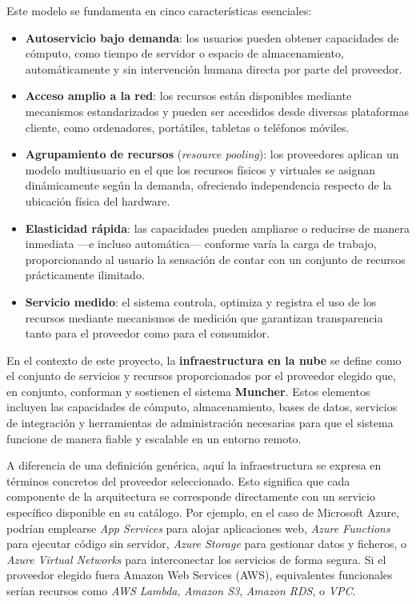 Este modelo se fundamenta en cinco características esenciales:

\begin{itemize}
	\item \textbf{Autoservicio bajo demanda}: los usuarios pueden obtener capacidades de cómputo, como tiempo de servidor o espacio de almacenamiento, automáticamente y sin intervención humana directa por parte del proveedor.

	\item \textbf{Acceso amplio a la red}: los recursos están disponibles mediante mecanismos estandarizados y pueden ser accedidos desde diversas plataformas cliente, como ordenadores, portátiles, tabletas o teléfonos móviles.

	\item \textbf{Agrupamiento de recursos} (\textit{resource pooling}): los proveedores aplican un modelo multiusuario en el que los recursos físicos y virtuales se asignan dinámicamente según la demanda, ofreciendo independencia respecto de la ubicación física del hardware.

	\item \textbf{Elasticidad rápida}: las capacidades pueden ampliarse o reducirse de manera inmediata —e incluso automática— conforme varía la carga de trabajo, proporcionando al usuario la sensación de contar con un conjunto de recursos prácticamente ilimitado.

	\item \textbf{Servicio medido}: el sistema controla, optimiza y registra el uso de los recursos mediante mecanismos de medición que garantizan transparencia tanto para el proveedor como para el consumidor.
\end{itemize}

En el contexto de este proyecto, la \textbf{infraestructura en la nube} se define como el conjunto de servicios y recursos proporcionados por el proveedor elegido que, en conjunto, conforman y sostienen el sistema \textbf{Muncher}. Estos elementos incluyen las capacidades de cómputo, almacenamiento, bases de datos, servicios de integración y herramientas de administración necesarias para que el sistema funcione de manera fiable y escalable en un entorno remoto.

A diferencia de una definición genérica, aquí la infraestructura se expresa en términos concretos del proveedor seleccionado. Esto significa que cada componente de la arquitectura se corresponde directamente con un servicio específico disponible en su catálogo. Por ejemplo, en el caso de Microsoft Azure, podrían emplearse \textit{App Services} para alojar aplicaciones web, \textit{Azure Functions} para ejecutar código sin servidor, \textit{Azure Storage} para gestionar datos y ficheros, o \textit{Azure Virtual Networks} para interconectar los servicios de forma segura. Si el proveedor elegido fuera Amazon Web Services (AWS), equivalentes funcionales serían recursos como \textit{AWS Lambda}, \textit{Amazon S3}, \textit{Amazon RDS}, o \textit{VPC}.

